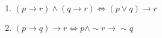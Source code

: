\documentclass[12pt]{article}
\begin{document}
\begin{enumerate}
\begin{enumerate}


\item  $(p \rightarrow r) \wedge (q \rightarrow r) \Leftrightarrow (p \vee  q) \rightarrow r $ %



\item $(p \rightarrow q) \rightarrow r \Leftrightarrow p \wedge \sim r \rightarrow \sim q$ %


\end{enumerate}






\end{enumerate}
\newpage

\end{document}
